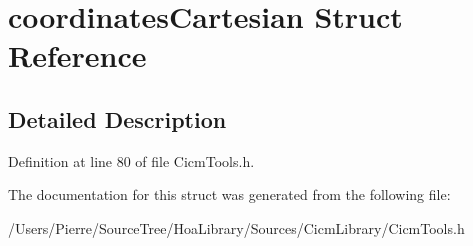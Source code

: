 \hypertarget{structcoordinates_cartesian}{\section{coordinates\-Cartesian Struct Reference}
\label{structcoordinates_cartesian}
}


\subsection{Detailed Description}


Definition at line 80 of file Cicm\-Tools.\-h.



The documentation for this struct was generated from the following file\-:\begin{DoxyCompactItemize}
\item 
/\-Users/\-Pierre/\-Source\-Tree/\-Hoa\-Library/\-Sources/\-Cicm\-Library/Cicm\-Tools.\-h\end{DoxyCompactItemize}

